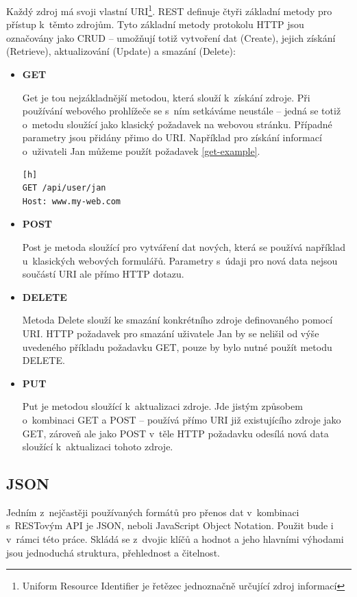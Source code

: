 \documentclass[thesis=B,czech]{FITthesis}[2012/06/26]
\begin{document}
	Každý zdroj má svoji vlastní URI\footnote{Uniform Resource Identifier je řetězec jednoznačně určující zdroj informací}. REST definuje čtyři základní metody pro přístup k~těmto zdrojům. Tyto základní metody protokolu HTTP jsou označovány jako CRUD -- umožňují totiž vytvoření dat (Create), jejich získání (Retrieve), aktualizování (Update) a smazání (Delete):
\begin{itemize}

\item\textbf{GET}

Get je tou nejzákladnější metodou, která slouží k~získání zdroje. Při používání webového prohlížeče se s~ním setkáváme neustále -- jedná se totiž o~metodu sloužící jako klasický požadavek na webovou stránku. Případné parametry jsou přidány přimo do URI. Například pro získání informací o~uživateli Jan můžeme použít požadavek \ref{get-example}.
\begin{lstlisting}[caption={Ukázka požadavku GET},label=get-example][h]
GET /api/user/jan
Host: www.my-web.com
\end{lstlisting}

\item\textbf{POST}

Post je metoda sloužící pro vytváření dat nových, která se používá například u~klasických webových formulářů. Parametry s~údaji pro nová data nejsou součástí URI ale přímo HTTP dotazu. 

\item\textbf{DELETE}

Metoda Delete slouží ke smazání konkrétního zdroje definovaného pomocí URI. HTTP požadavek pro smazání uživatele Jan by se nelišil od výše uvedeného příkladu požadavku GET, pouze by bylo nutné použít metodu DELETE. 

\item\textbf{PUT}

Put je metodou sloužící k~aktualizaci zdroje. Jde jistým způsobem o~kombinaci GET a POST -- používá přímo URI již existujícího zdroje jako GET, zároveň ale jako POST v~těle HTTP požadavku odesílá nová data sloužící k~aktualizaci tohoto zdroje. 

\end{itemize}

	
\subsection{JSON}	
	Jedním z~nejčastěji používaných formátů pro přenos dat v~kombinaci s~RESTovým API je JSON, neboli JavaScript Object Notation. Použit bude i v~rámci této práce. Skládá se z~dvojic klíčů a hodnot a jeho hlavními výhodami jsou jednoduchá struktura, přehlednost a čitelnost\cite{json-web}. 
	
\end{document}

